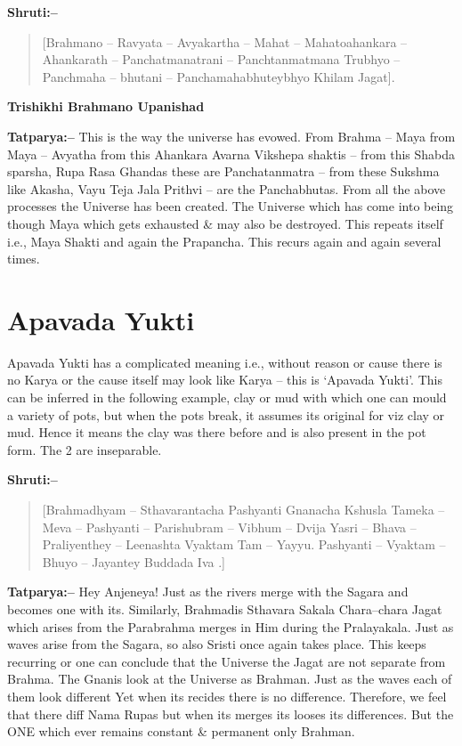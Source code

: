 \textbf{Shruti:–}

\begin{verse}
[Brahmano – Ravyata – Avyakartha – Mahat – Mahatoahankara – Ahankarath – Panchatmanatrani – Panchtanmatmana Trubhyo – Panchmaha – bhutani – Panchamahabhuteybhyo Khilam Jagat].
\end{verse}

\begin{flushright}
\textbf{Trishikhi Brahmano Upanishad}
\end{flushright}

\textbf{Tatparya:–} This is the way the universe has evowed. From Brahma – Maya from Maya – Avyatha from this Ahankara Avarna Vikshepa shaktis – from this Shabda sparsha, Rupa Rasa Ghandas these are Panchatanmatra – from these Sukshma like Akasha, Vayu Teja Jala Prithvi – are the Panchabhutas. From all the above processes the Universe has been created. The Universe which has come into being though Maya which gets exhausted \& may also be destroyed. This repeats itself i.e., Maya Shakti and again the Prapancha. This recurs again and again several times.

\chapter{Apavada Yukti}

Apavada Yukti has a complicated meaning i.e., without reason or cause there is no Karya or the cause itself may look like Karya – this is ‘Apavada Yukti’. This can be inferred in the following example, clay or mud with which one can mould a variety of pots, but when the pots break, it assumes its original for viz clay or mud. Hence it means the clay was there before and is also present in the pot form. The 2 are inseparable.

\textbf{Shruti:–}

\begin{verse}
[Brahmadhyam – Sthavarantacha Pashyanti Gnanacha Kshusla  Tameka – Meva – Pashyanti – Parishubram – Vibhum – Dvija  Yasri – Bhava – Praliyenthey – Leenashta Vyaktam Tam – Yayyu.  Pashyanti – Vyaktam – Bhuyo – Jayantey Buddada Iva .]
\end{verse}

\textbf{Tatparya:–} Hey Anjeneya! Just as the rivers merge with the Sagara and becomes one with its. Similarly, Brahmadis Sthavara Sakala Chara–chara Jagat which arises from the Parabrahma merges in Him during the Pralayakala. Just as waves arise from the Sagara, so also Sristi once again takes place. This keeps recurring or one can conclude that the Universe the Jagat are not separate from Brahma. The Gnanis look at the Universe as Brahman. Just as the waves each of them look different Yet when its recides there is no difference. Therefore, we feel that there diff Nama Rupas but when its merges its looses its differences. But the ONE which ever remains constant \& permanent only Brahman.

